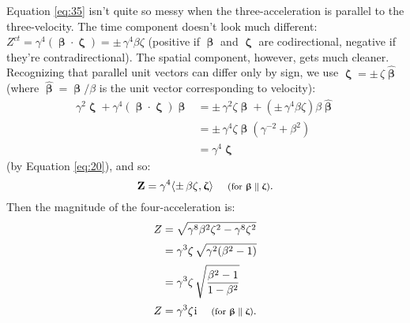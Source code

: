 \documentclass[12pt]{article}
\renewcommand{\vv}[1]{\mathbf{#1}}
\newcommand{\vvbeta}{\bm{\upbeta}}
\newcommand{\hatbeta}{\bm{\hat{\upbeta}}}
\newcommand{\vvzeta}{\bm{\upzeta}}
\begin{document}
Equation \ref{eq:35} isn't quite so messy when the three-acceleration is parallel to the three-velocity. The time component doesn't look much different: ${Z^{ct} = \gamma^4 (\vvbeta \cdot \vvzeta) = \pm \, \gamma^4 \beta \zeta}$ (positive if $\vvbeta$ and $\vvzeta$ are codirectional, negative if they're contradirectional). The spatial component, however, gets much cleaner. Recognizing that parallel unit vectors can differ only by sign, we use $\vvzeta = \pm \, \zeta \hatbeta$ (where $\hatbeta = \vvbeta / \beta$ is the unit vector corresponding to velocity):
\begin{equation*}
\begin{split}
\gamma^2 \vvzeta + \gamma^4 (\vvbeta \cdot \vvzeta)\vvbeta &= \pm \, \gamma^2 \zeta \hatbeta + ( \pm \, \gamma^4 \beta \zeta) \beta \hatbeta \\
&= \pm \, \gamma^4 \zeta \hatbeta \left(\gamma^{-2} + \beta^2 \right)\\
&= \gamma^4 \vvzeta
\end{split}
\end{equation*}
(by Equation \ref{eq:20}), and so:
\begin{equation}\label{eq:fa}
\vv Z = \gamma^4 \langle \pm \, \beta \zeta, \vvzeta \rangle \quad \textrm{\footnotesize{ (for $\vvbeta \parallel \vvzeta$)}}.
\end{equation}
Then the magnitude of the four-acceleration is:
\begin{equation}\label{eq:36}
\begin{split}
Z &= \sqrt{\gamma^8 \beta^2 \zeta^2 - \gamma^8 \zeta^2} \\[2pt]
&= \gamma^3 \zeta \, \sqrt{\gamma^2 (\beta^2 - 1)} \\[2pt]
&= \gamma^3 \zeta \, \sqrt{\frac{\beta^2 - 1}{1 - \beta^2}} \\[2pt]
Z &= \gamma^3 \zeta \mkern1mu \mathrm{i} \quad \textrm{\footnotesize{ (for $\vvbeta \parallel \vvzeta$)}}.
\end{split}
\end{equation}
\end{document}
